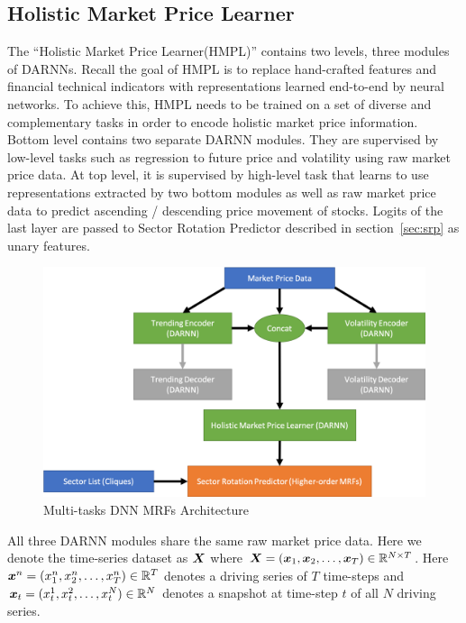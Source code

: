 \documentclass[sigconf, anonymous, review]{acmart}
\renewcommand{\cite}{\citep}
\begin{document}
\subsection{Holistic Market Price Learner}
\label{sec:hmpl}

The ``Holistic Market Price Learner(HMPL)'' contains two levels,
three modules of DARNNs\cite{qin2017dual}. Recall the goal of
HMPL is to replace hand-crafted features and financial technical
indicators with representations learned end-to-end by neural
networks. To achieve this, HMPL needs to be trained on a set of
diverse and complementary tasks in order to encode holistic
market price information. Bottom level contains two separate
DARNN modules. They are supervised by low-level tasks such as
regression to future price and volatility using raw market price
data. At top level, it is supervised by high-level task that
learns to use representations extracted by two bottom modules as
well as raw market price data to predict ascending / descending
price movement of stocks. Logits of the last layer are passed to
Sector Rotation Predictor described in section~\ref{sec:srp} as
unary features.

\begin{figure}[ht]
  \centering
  \includegraphics[width=1\columnwidth]{Methodology/figures/mrfrnn}
  \caption{\label{fig:mrfrnn} Multi-tasks DNN MRFs Architecture}
\end{figure}

All three DARNN modules share the same raw market price data.
Here we denote the time-series dataset as ${\boldsymbol{X}}$ where
${\boldsymbol{X}}=({\boldsymbol{x}}_1,{\boldsymbol{x}}_2,\dots,{\boldsymbol{x}}_T)\in \mathbb{R}^{N\times T}$. Here
${\boldsymbol{x}}^n=(x_1^n,x_2^n,\dots,x_T^n) \in \mathbb{R}^T$ denotes a driving
series of $T$ time-steps and ${\boldsymbol{x}}_t=(x_t^1,x_t^2\\ ,\dots
,x_t^N)\in \mathbb{R}^N$ denotes a snapshot at time-step $t$ of all
$N$ driving series.
\end{document}
